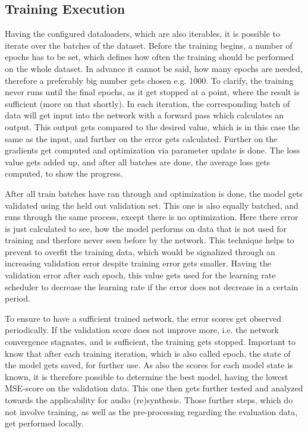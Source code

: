 \subsection{Training Execution}
Having the configured dataloaders, which are also iterables, it is possible to iterate over the batches of the dataset. Before the training begins, a number of epochs has to be set, which defines how often the training should be performed on the whole dataset. In advance it cannot be said, how many epochs are needed, therefore a preferably big number gets chosen e.g. 1000. To clarify, the training never runs until the final epochs, as it get stopped at a point, where the result is sufficient (more on that shortly). In each iteration, the corresponding batch of data will get input into the network with a forward pass which calculates an output. This output gets compared to the desired value, which is in this case the same as the input, and further on the error gets calculated. Further on the gradients get computed and optimization via parameter update is done. The loss value gets added up, and after all batches are done, the average loss gets computed, to show the progress. 

After all train batches have ran through and optimization is done, the model gets validated using the held out validation set. This one is also equally batched, and runs through the same process, except there is no optimization. Here there error is just calculated to see, how the model performs on data that is not used for training and therfore never seen before by the network. This technique helps to prevent to overfit the training data, which would be signalized through an increasing validation error despite training error gets smaller. Having the validation error after each epoch, this value gets used for the learning rate scheduler to decrease the learning rate if the error does not decrease in a certain period. 

 To ensure to have a sufficient trained network, the error scores get observed periodically. If the validation score does not improve more, i.e. the network convergence stagnates, and is sufficient, the training gets stopped. Important to know that after each training iteration, which is also called epoch, the state of the model gets saved, for further use. As also the scores for each model state is known, it is therefore possible to determine the best model, having the lowest MSE-score on the validation data. This one then gets further tested and analyzed towards the applicability for audio (re)synthesis. Those further steps, which do not involve training, as well as the pre-processing regarding the evaluation data, get performed locally. 

